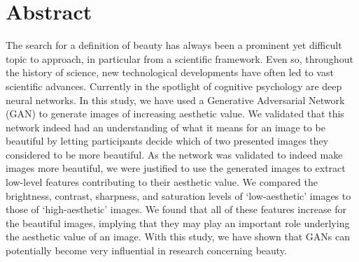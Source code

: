\documentclass[../main.tex]{subfiles}
\begin{document}
\newpage
\section{Abstract}
The search for a definition of beauty has always been a prominent yet difficult topic to approach, in particular from a scientific framework. Even so, throughout the history of science, new technological developments have often led to vast scientific advances. Currently in the spotlight of cognitive psychology are deep neural networks. In this study, we have used a Generative Adversarial Network (GAN) to generate images of increasing aesthetic value. We validated that this network indeed had an understanding of what it means for an image to be beautiful by letting participants decide which of two presented images they considered to be more beautiful. As the network was validated to indeed make images more beautiful, we were justified to use the generated images to extract low-level features contributing to their aesthetic value. We compared the brightness, contrast, sharpness, and saturation levels of `low-aesthetic' images to those of `high-aesthetic' images. We found that all of these features increase for the beautiful images, implying that they may play an important role underlying the aesthetic value of an image. With this study, we have shown that GANs can potentially become very influential in research concerning beauty.
\end{document}
